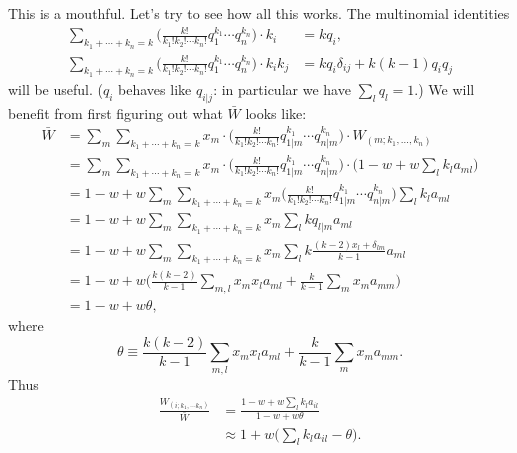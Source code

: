 \documentclass[14pt, a4paper, justified]{article}
\begin{document}
This is a mouthful.
Let's try to see how all this works.
The multinomial identities
\begin{equation}
    \begin{split}
        \sum_{k_1 + \cdots + k_n = k}\Big( \frac{k!}{k_1! k_2! \cdots k_n!} q_1^{k_1} \cdots q_n^{k_n} \Big) \cdot k_i &= kq_i,
        \\
        \sum_{k_1 + \cdots + k_n = k}\Big( \frac{k!}{k_1! k_2! \cdots k_n!} q_1^{k_1} \cdots q_n^{k_n} \Big) \cdot k_i k_j &= kq_i\delta_{ij} + k(k-1)q_i q_j
    \end{split}
\end{equation}
will be useful.
($q_i$ behaves like $q_{i|j}$: in particular we have $\sum_l q_l = 1$.)
We will benefit from first figuring out what $\bar{W}$ looks like:
\begin{equation}
    \begin{split}
        \bar{W} &= \sum_m \sum_{k_1 + \cdots + k_n = k} x_m \cdot \Big( \frac{k!}{k_1! k_2! \cdots k_n!} q_{1|m}^{k_1} \cdots q_{n|m}^{k_n} \Big) \cdot W_{(m; k_1, \ldots ,k_n)}
        \\
        &= \sum_m \sum_{k_1 + \cdots + k_n = k} x_m \cdot \Big( \frac{k!}{k_1! k_2! \cdots k_n!} q_{1|m}^{k_1} \cdots q_{n|m}^{k_n} \Big) \cdot \Big( 1 - w + w\sum_l k_l a_{ml} \Big)
        \\
        &= 1 - w + w\sum_m \sum_{k_1 + \cdots + k_n = k} x_m \Big( \frac{k!}{k_1! k_2! \cdots k_n!} q_{1|m}^{k_1} \cdots q_{n|m}^{k_n} \Big) \sum_l k_l a_{ml}
        \\
        &= 1 - w + w\sum_m \sum_{k_1 + \cdots + k_n = k} x_m \sum_l k q_{l|m} a_{ml}
        \\
        &= 1 - w + w\sum_m \sum_{k_1 + \cdots + k_n = k} x_m \sum_l k \frac{(k-2)x_l + \delta_{lm}}{k-1} a_{ml}
        \\
        &= 1 - w + w \Big(\frac{k(k-2)}{k-1} \sum_{m,l} x_m x_l a_{ml} + \frac{k}{k-1} \sum_m x_m a_{mm} \Big)
        \\
        &= 1 - w + w\theta,
    \end{split}
\end{equation}
where
\begin{equation}
    \theta \equiv \frac{k(k-2)}{k-1} \sum_{m,l} x_m x_l a_{ml} + \frac{k}{k-1} \sum_m x_m a_{mm}.
\end{equation}
Thus
\begin{equation}
    \begin{split}
        \frac{W_{(i; k_1, \cdots k_n)}}{\bar{W}} & = \frac{1 - w + w\sum_l k_l a_{il}}{1 - w + w\theta}
        \\
        & \approx 1 + w \Big( \sum_l k_l a_{il} - \theta \Big).
    \end{split}
\end{equation}
\end{document}
